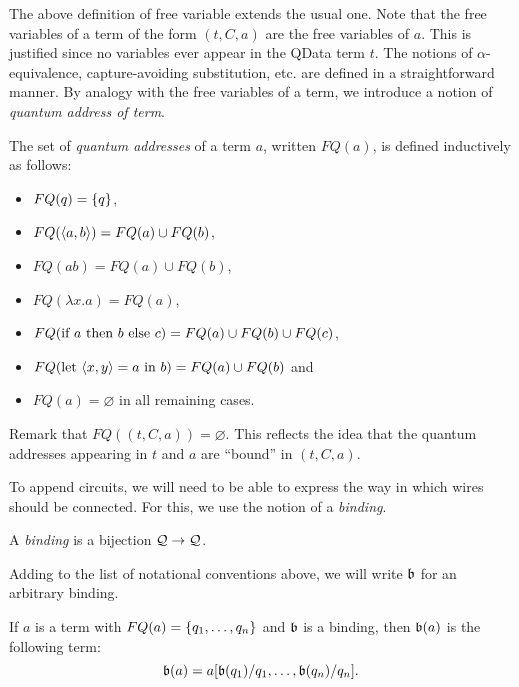 \documentclass{article}
\begin{document}
The above definition of free variable extends the usual one. Note 
that the free variables of a term of the form $(t,C,a)$ are the 
free variables of $a$. This is justified since no variables ever 
appear in the QData term $t$. The notions of $\alpha$-equivalence, 
capture-avoiding substitution, etc. are defined in a straightforward 
manner. By analogy with the free variables of a term, we introduce a 
notion of \emph{quantum address of term}.

\begin{definition}
The set of \emph{quantum addresses} of a term $a$, written $FQ(a)$, is 
defined inductively as follows:
\begin{itemize}
  \item $FQ(q)=\{q\}$,
  \item $FQ(\langle a,b\rangle)=FQ(a)\cup FQ(b)$,
  \item $FQ(ab)=FQ(a)\cup FQ(b)$,
  \item $FQ(\lambda x.a)=FQ(a)$,
  \item $FQ(\text{if}~ a ~\text{then}~ b ~\text{else}~ c) = FQ(a) \cup FQ(b) \cup FQ(c)$,
  \item $FQ(\text{let}~ \langle x,y\rangle = a ~\text{in}~ b)= FQ(a)\cup FQ(b)$ and
  \item $FQ(a)=\varnothing$ in all remaining cases.
\end{itemize}
\end{definition}

Remark that $FQ((t,C,a))=\varnothing$. This reflects the idea that the 
quantum addresses appearing in $t$ and $a$ are ``bound'' in $(t,C,a)$. 

To append circuits, we will need to be able to express the way in 
which wires should be connected. For this, we use the notion of a 
\emph{binding}.

\begin{definition}
A \emph{binding} is a bijection $\mathcal{Q}\to \mathcal{Q}$.
\end{definition}


Adding to the list of notational conventions above, we will write 
$\mathfrak{b}$ for an arbitrary binding. 

\begin{definition}
If $a$ is a term with $FQ(a)=\{q_1,\ldots,q_n\}$ and $\mathfrak{b}$ is 
a binding, then $\mathfrak{b}(a)$ is the following term:
\[
\mathfrak{b}(a)= a[\mathfrak{b}(q_1)/q_1,\ldots ,\mathfrak{b}(q_n)/q_n].
\]
\end{definition}
\end{document}
